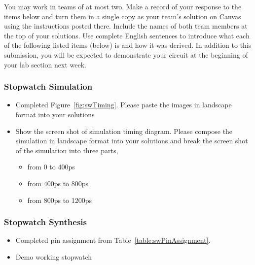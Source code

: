 You may work in teams of at most two. Make a record of your response to
the items below and turn them in a single copy as your team's solution
on Canvas using the instructions posted there. Include the names of both
team members at the top of your solutions. Use complete English
sentences to introduce what each of the following listed items (below)
is and how it was derived. In addition to this submission, you will be
expected to demonstrate your circuit at the beginning of your lab
section next week.

\subsubsection{Stopwatch Simulation}

\begin{itemize}
\item
  Completed Figure~\ref{fig:swTiming}. Please paste the images in landscape format into your solutions

\item
  Show the screen shot of simulation timing diagram. Please compose the simulation in landscape 
  format into your solutions and break the screen shot of the simulation into three parts,

  \begin{itemize}
    \item
      from 0 to 400ps
    \item
      from 400ps to 800ps
    \item
      from 800ps to 1200ps
\end{itemize}
\end{itemize}

\subsubsection{Stopwatch Synthesis}

\begin{itemize}
\item
  Completed pin assignment from Table~\ref{table:swPinAssignment}.
\item
  Demo working stopwatch
\end{itemize}
